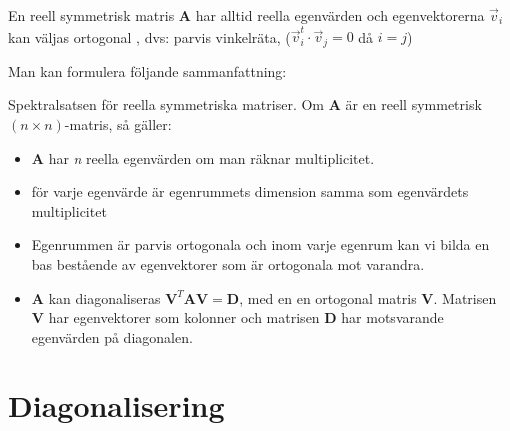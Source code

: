 \begin{sats}
	En reell symmetrisk matris \textbf{A} har alltid reella egenvärden och egenvektorerna $\vec{v}_i$ kan väljas ortogonal , dvs: parvis vinkelräta, ($\vec{v}_i^t \cdot \vec{v}_j = 0$ då $i = j$)
\end{sats}
Man kan formulera följande sammanfattning:
\begin{sats}
	Spektralsatsen för reella symmetriska matriser. Om \textbf{A} är en reell symmetrisk $(n \times n)$-matris, så gäller:
	\begin{itemize}
		\item \textbf{A} har \textit{n} reella egenvärden om man räknar multiplicitet.
		\item för varje egenvärde är egenrummets dimension samma som egenvärdets multiplicitet
		\item Egenrummen är parvis ortogonala och inom varje egenrum kan vi bilda en bas bestående av egenvektorer som är ortogonala mot varandra.
		\item \textbf{A} kan diagonaliseras $\mathbf{V}^T \mathbf{A} \mathbf{V} = \mathbf{D}$, med en en ortogonal matris \textbf{V}. Matrisen \textbf{V} har egenvektorer som kolonner och matrisen \textbf{D} har motsvarande egenvärden på diagonalen. 
	\end{itemize}
\end{sats}

\section{Diagonalisering} %
\label{sec:diagonalisering}

